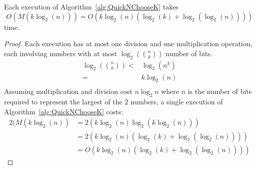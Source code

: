 \begin{theorem}
\label{theorem:QuickNChooseKcomplexity}
Each execution of Algorithm~\ref{alg:QuickNChooseK} takes $$O\left(M(k \log_2 (n))\right) = O \left(k\log_2 (n)(\log_2 (k)+\log_2(\log_2 (n)))\right)$$ time.
\end{theorem}
\begin{proof}
Each execution has at most one division and one multiplication operation, each involving numbers with at most $\log_2 ({n \choose k})$ number of bits.
\begin{align}
\log_2 \left({n \choose k}\right) <& \log_2 (n^k) \\
=& k\log_2 (n) \\
\end{align}
Assuming multiplication and division cost $n \log_2 n$ where $n$ is the number of bits required to represent the largest of the $2$ numbers, a single execution of Algorithm~\ref{alg:QuickNChooseK} costs:
\begin{align}
2 (M(k\log_2 (n) ) &= 2 (k\log_2 (n)\log_2(k\log_2 (n))) \\
&= 2 (k\log_2 (n)(\log_2 (k)+\log_2(\log_2 (n)))) \\
&= O\left(k\log_2 (n)(\log_2 (k)+\log_2(\log_2 (n)))\right)
\end{align}
\end{proof}


